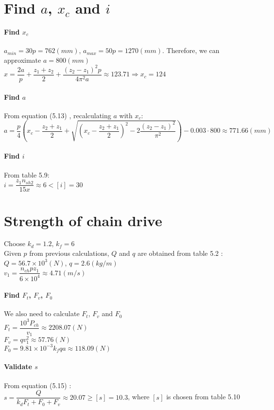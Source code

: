 \section{Find $ a $, $ x_c $ and $ i $}
\paragraph{Find $ x_c $}$ a_{min}=30p=762\unit{(mm)} $, $ a_{max} = 50p=1270\unit{(mm)}$. Therefore, we can approximate $ a=800\unit{(mm)} $\\
$ x = \dfrac{2a}{p} + \dfrac{z_1+z_2}{2} + \dfrac{(z_2-z_1)^2p}{4\pi^2a} \approx 123.71 \Rightarrow x_c = 124$
\paragraph{Find $ a $}From equation (5.13) , recalculating $ a $ with $ x_c $:\\
$ a = \dfrac{p}{4}\left(x_c-\dfrac{z_2+z_1}{2}+\sqrt{\left(x_c-\dfrac{z_2+z_1}{2}\right)^2-2\dfrac{(z_2-z_1)^2}{\pi^2}}\right) - 0.003\cdot800\approx 771.66\unit{(mm)}$
\paragraph{Find $ i $} From table 5.9:\\ $i=\dfrac{z_1n_{sh2}}{15x}\approx6<[i]=30 $
\section{Strength of chain drive}
Choose $ k_d = 1.2 $, $ k_f = 6 $\\
Given $ p $ from previous calculations, $ Q $ and $ q $ are obtained from table 5.2 :\\
$ Q = 56.7\times10^3\unit{(N)} $, $ q = 2.6\unit{(kg/m)} $ \\
$ v_1=\dfrac{n_{ch}pz_1}{6\times10^4}\approx4.71\unit{(m/s)}$
\paragraph{Find $ F_t $, $ F_v $, $ F_0 $}We also need to calculate $ F_t $, $ F_v $ and $ F_0 $\\
$ F_t = \dfrac{10^3P_{ch}}{v_1} \approx 2208.07\unit{(N)}$\\
$ F_v=qv_1^2\approx57.76\unit{(N)} $\\
$ F_0=9.81\times10^{-3}k_fqa \approx118.09\unit{(N)}$
\paragraph{Validate $ s $}From equation (5.15) :\\ $ s = \dfrac{Q}{k_dF_t+F_0+F_v} \approx 20.07 \geq [s]=10.3$, where $ [s] $ is chosen from table 5.10 

